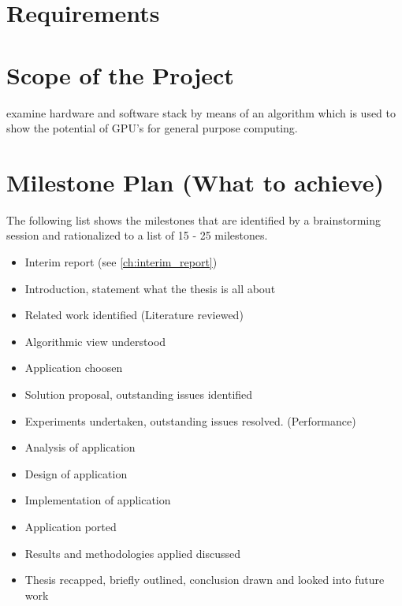 \label{ch:project_planning}
\section*{Requirements} %
\label{sub:requirements}


\section*{Scope of the Project} %
\label{sec:scope_of_the_project}
examine hardware and software stack by means of an algorithm which is used
to show the potential of GPU's for general purpose computing.

\section*{Milestone Plan (What to achieve)} %
\label{sec:milestone_plan_what_to_achieve_}
The following list shows the milestones that are identified by a 
brainstorming session and rationalized to a list of 15 - 25 milestones.

\begin{itemize}
	\item Interim report (see \ref{ch:interim_report})
	\item Introduction, statement what the thesis is all about
	\item Related work identified (Literature reviewed)
	\item Algorithmic view understood
	\item Application choosen
	\item Solution proposal, outstanding issues identified
	\item Experiments undertaken, outstanding issues resolved. (Performance)
	\item Analysis of application
	\item Design of application
	\item Implementation of application
	\item Application ported
	\item Results and methodologies applied discussed
	\item Thesis recapped, briefly outlined, conclusion drawn and looked into future work
\end{itemize}

